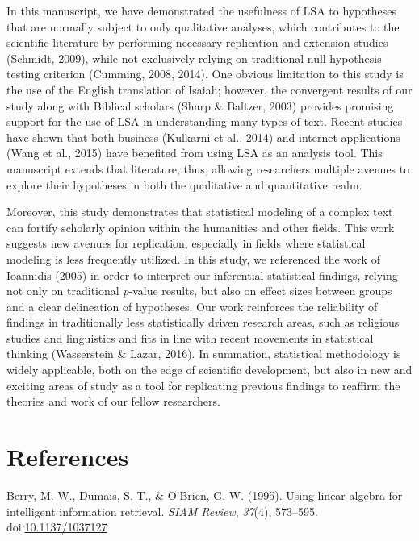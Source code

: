 \documentclass[english,man]{apa6}
\theoremstyle{definition}
\theoremstyle{definition}
\theoremstyle{definition}
\theoremstyle{remark}
\begin{document}
In this manuscript, we have demonstrated the usefulness of LSA to
hypotheses that are normally subject to only qualitative analyses, which
contributes to the scientific literature by performing necessary
replication and extension studies (Schmidt, 2009), while not exclusively
relying on traditional null hypothesis testing criterion (Cumming, 2008,
2014). One obvious limitation to this study is the use of the English
translation of Isaiah; however, the convergent results of our study
along with Biblical scholars (Sharp \& Baltzer, 2003) provides promising
support for the use of LSA in understanding many types of text. Recent
studies have shown that both business (Kulkarni et al., 2014) and
internet applications (Wang et al., 2015) have benefited from using LSA
as an analysis tool. This manuscript extends that literature, thus,
allowing researchers multiple avenues to explore their hypotheses in
both the qualitative and quantitative realm.

Moreover, this study demonstrates that statistical modeling of a complex
text can fortify scholarly opinion within the humanities and other
fields. This work suggests new avenues for replication, especially in
fields where statistical modeling is less frequently utilized. In this
study, we referenced the work of Ioannidis (2005) in order to interpret
our inferential statistical findings, relying not only on traditional
\emph{p}-value results, but also on effect sizes between groups and a
clear delineation of hypotheses. Our work reinforces the reliability of
findings in traditionally less statistically driven research areas, such
as religious studies and linguistics and fits in line with recent
movements in statistical thinking (Wasserstein \& Lazar, 2016). In
summation, statistical methodology is widely applicable, both on the
edge of scientific development, but also in new and exciting areas of
study as a tool for replicating previous findings to reaffirm the
theories and work of our fellow researchers.

\newpage

\section{References}\label{references}

\setlength{\parindent}{-0.5in} \setlength{\leftskip}{0.5in}

\hypertarget{refs}{}
\hypertarget{ref-Berry1995}{}
Berry, M. W., Dumais, S. T., \& O'Brien, G. W. (1995). Using linear
algebra for intelligent information retrieval. \emph{SIAM Review},
\emph{37}(4), 573--595.
doi:\href{https://doi.org/10.1137/1037127}{10.1137/1037127}
\end{document}
